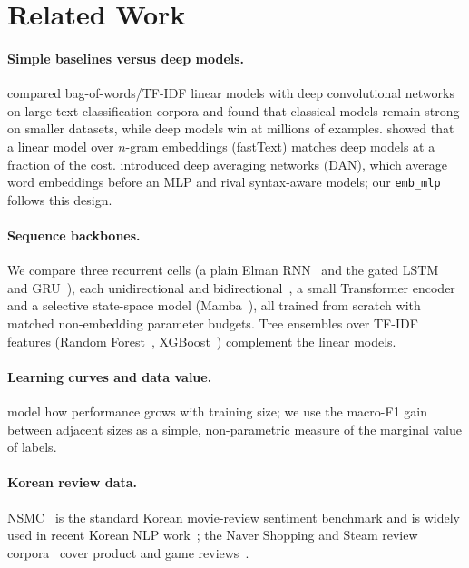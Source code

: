 \section{Related Work}
\label{sec:related}

\paragraph{Simple baselines versus deep models.}
\citet{zhang2015character} compared bag-of-words/TF-IDF linear models with deep
convolutional networks on large text classification corpora and found that
classical models remain strong on smaller datasets, while deep models win at
millions of examples. \citet{joulin2017bag} showed that a linear model over
$n$-gram embeddings (fastText) matches deep models at a fraction of the cost.
\citet{iyyer2015deep} introduced deep averaging networks (DAN), which average
word embeddings before an MLP and rival syntax-aware models; our \texttt{emb\_mlp}
follows this design.

\paragraph{Sequence backbones.}
We compare three recurrent cells (a plain Elman RNN~\cite{elman1990finding} and the gated
LSTM~\cite{hochreiter1997long} and GRU~\cite{cho2014learning}), each unidirectional and
bidirectional~\cite{schuster1997bidirectional}, a small Transformer encoder~\cite{vaswani2017attention}
and a selective state-space model (Mamba~\cite{gu2023mamba}), all trained from
scratch with matched non-embedding parameter budgets. Tree ensembles over TF-IDF
features (Random Forest~\cite{breiman2001random}, XGBoost~\cite{chen2016xgboost})
complement the linear models.

\paragraph{Learning curves and data value.}
\citet{kolachina2012prediction} model how performance grows with training size;
we use the macro-F1 gain between adjacent sizes as a simple, non-parametric measure
of the marginal value of labels.

\paragraph{Korean review data.}
NSMC~\cite{nsmc} is the standard Korean movie-review sentiment benchmark and is
widely used in recent Korean NLP work~\cite{jang2024enhancing,han2024deep}; the
Naver Shopping and Steam review corpora~\cite{bab2min_corpus} cover product and
game reviews~\cite{park2023offensive}.
